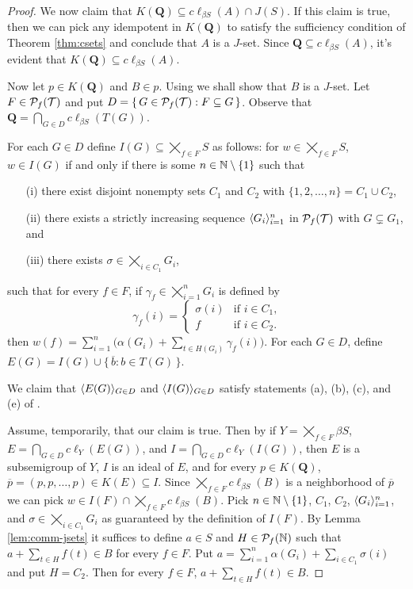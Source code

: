 \begin{proof}
  We now claim that $K(\mathbf{Q}) \subseteq c\ell_{\beta S}(A) \cap J(S)$. 
  If this claim is true, then we can pick any idempotent in $K(\mathbf{Q})$ to satisfy the sufficiency condition of Theorem \ref{thm:csets} and conclude that $A$ is a $J$-set.
  Since $\mathbf{Q} \subseteq c\ell_{\beta S}(A)$, it's evident that $K(\mathbf{Q}) \subseteq c\ell_{\beta S}(A)$. 

  Now let $p \in K(\mathbf{Q})$ and $B \in p$.
  Using \cite[Lemma 14.9]{Hindman:1998fk} we shall show that $B$ is a $J$-set.
  Let $F \in \mathcal{P}_f(\mathcal{T})$ and put $D = \{\, G \in \mathcal{P}_f(\mathcal{T}) : F \subseteq G \,\}$. 
  Observe that $\mathbf{Q} = \bigcap_{G \in D} c\ell_{\beta S} (T(G))$.

  For each $G \in D$ define $I(G) \subseteq \bigtimes_{f \in F} S$ as follows: for $w \in \bigtimes_{f \in F} S$, $w \in I(G)$ if and only if there is some $n \in \mathbb{N} \setminus \{1\}$ such that
  \begin{itemize}
    \item[(i)]
      there exist disjoint nonempty sets $C_1$ and $C_2$ with $\{1, 2, \ldots, n\} = C_1 \cup C_2$,

    \item[(ii)]
      there exists a strictly increasing sequence $\langle G_i \rangle_{i=1}^n$ in $\mathcal{P}_f(\mathcal{T})$ with $G \subsetneq G_1$, and

    \item[(iii)]
      there exists $\sigma \in \bigtimes_{i \in C_1} G_i$,
  \end{itemize}
  such that for every $f \in F$, if $\gamma_f \in \bigtimes_{i=1}^n G_i$ is defined by
  \[
    \gamma_f(i) =
    \begin{cases}
      \sigma(i) & \mbox{if $i \in C_1$,} \\
      f & \mbox{if $i \in C_2$.}
    \end{cases}
  \]
  then $w(f) = \sum_{i=1}^n\bigl( \alpha(G_i) + \sum_{t \in H(G_i)} \gamma_f(i) \bigr)$.
  For each $G \in D$, define $E(G) = I(G) \cup \{\, \overline{b} : b \in T(G) \,\}$.

  We claim that $\langle E(G) \rangle_{G \in D}$ and $\langle I(G) \rangle_{G \in D}$ satisfy statements (a), (b), (c), and (e) of \cite[Lemma 14.9]{Hindman:1998fk}.

  Assume, temporarily, that our claim is true. 
  Then by \cite[Lemma 14.9]{Hindman:1998fk} if $Y = \bigtimes_{f \in F} \beta S$, $E = \bigcap_{G \in D} c\ell_Y(E(G))$, and $I = \bigcap_{G \in D} c\ell_Y(I(G))$, then $E$ is a subsemigroup of $Y$, $I$ is an ideal of $E$, and for every $p \in K(\mathbf{Q})$, $\overline{p} = (p, p, \ldots, p) \in K(E) \subseteq I$. 
  Since $\bigtimes_{f \in F} c\ell_{\beta S} (B)$ is a neighborhood of $\overline{p}$ we can pick $w \in I(F) \cap \bigtimes_{f \in F} c\ell_{\beta S} (B)$. 
  Pick $n \in \mathbb{N}\setminus \{1\}$, $C_1$, $C_2$, $\langle G_i \rangle_{i=1}^n$, and $\sigma \in \bigtimes_{i \in C_1} G_i$ as guaranteed by the definition of $I(F)$. 
  By Lemma \ref{lem:comm-jsets} it suffices to define $a \in S$ and $H \in \mathcal{P}_f(\mathbb{N})$ such that $a + \sum_{t \in H} f(t) \in B$ for every $f \in F$. 
  Put $a = \sum_{i=1}^n \alpha(G_i) + \sum_{i \in C_1} \sigma(i)$ and put $H = C_2$.
  Then for every $f \in F$, $a + \sum_{t \in H} f(t) \in B$.


\end{proof}
